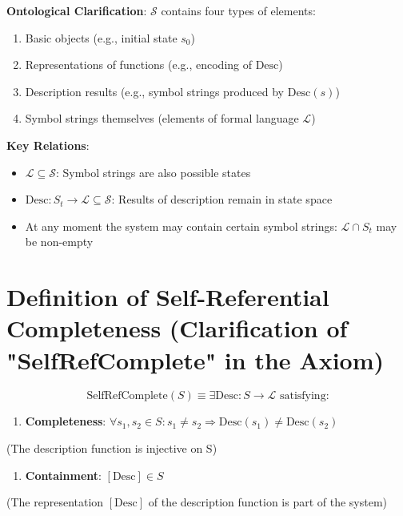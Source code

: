 \textbf{Ontological Clarification}: $\mathcal{S}$ contains four types of elements:
\begin{enumerate}
\item Basic objects (e.g., initial state $s_0$)
\item Representations of functions (e.g., encoding of $\text{Desc}$)
\item Description results (e.g., symbol strings produced by $\text{Desc}(s)$)
\item Symbol strings themselves (elements of formal language $\mathcal{L}$)
\end{enumerate}

\textbf{Key Relations}:
\begin{itemize}
\item $\mathcal{L} \subseteq \mathcal{S}$: Symbol strings are also possible states
\item $\text{Desc}: S_t \to \mathcal{L} \subseteq \mathcal{S}$: Results of description remain in state space
\item At any moment the system may contain certain symbol strings: $\mathcal{L} \cap S_t$ may be non-empty
\end{itemize}

\section{Definition of Self-Referential Completeness (Clarification of "SelfRefComplete" in the Axiom)}
\label{sec:ch01_axiom_and_derivation:definition-of-self-referential-completeness-clarification-of-selfrefcomplete-in-the-axiom}

\begin{equation}
\text{SelfRefComplete}(S) \equiv \exists \text{Desc}: S \to \mathcal{L} \text{ satisfying:}
\end{equation}

\begin{enumerate}
\item \textbf{Completeness}: $\forall s_1, s_2 \in S: s_1 \neq s_2 \Rightarrow \text{Desc}(s_1) \neq \text{Desc}(s_2)$
\end{enumerate}
  (The description function is injective on S)

\begin{enumerate}
\item \textbf{Containment}: $[\text{Desc}] \in S$ 
\end{enumerate}
  (The representation $[\text{Desc}]$ of the description function is part of the system)

